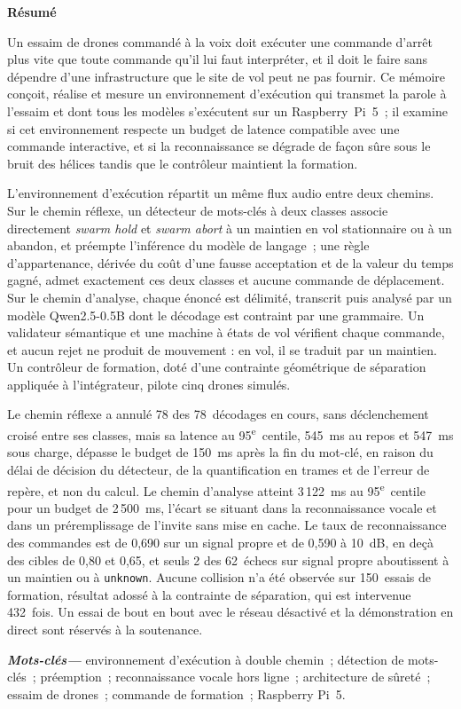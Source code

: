 \thispagestyle{empty}
\vspace*{4cm}
\begin{center}{\Huge\bfseries Résumé}\end{center}
\vskip 1cm
\noindent Un essaim de drones commandé à la voix doit exécuter une commande d'arrêt plus vite que
toute commande qu'il lui faut interpréter, et il doit le faire sans dépendre d'une infrastructure que
le site de vol peut ne pas fournir. Ce mémoire conçoit, réalise et mesure un environnement
d'exécution qui transmet la parole à l'essaim et dont tous les modèles s'exécutent sur un
Raspberry~Pi~5~; il examine si cet environnement respecte un budget de latence compatible avec une
commande interactive, et si la reconnaissance se dégrade de façon sûre sous le bruit des hélices
tandis que le contrôleur maintient la formation.

\vspace{0.3cm}
\noindent L'environnement d'exécution répartit un même flux audio entre deux chemins. Sur le chemin
réflexe, un détecteur de mots-clés à deux classes associe directement \emph{swarm hold} et
\emph{swarm abort} à un maintien en vol stationnaire ou à un abandon, et préempte l'inférence du
modèle de langage~; une règle d'appartenance, dérivée du coût d'une fausse acceptation et de la
valeur du temps gagné, admet exactement ces deux classes et aucune commande de déplacement. Sur le
chemin d'analyse, chaque énoncé est délimité, transcrit puis analysé par un modèle Qwen2.5-0.5B dont
le décodage est contraint par une grammaire. Un validateur sémantique et une machine à états de vol
vérifient chaque commande, et aucun rejet ne produit de mouvement : en vol, il se traduit par un
maintien. Un contrôleur de formation, doté d'une contrainte géométrique de séparation appliquée à
l'intégrateur, pilote cinq drones simulés.

\vspace{0.3cm}
\noindent Le chemin réflexe a annulé 78 des 78~décodages en cours, sans déclenchement croisé entre
ses classes, mais sa latence au 95\textsuperscript{e}~centile, 545~ms au repos et 547~ms sous
charge, dépasse le budget de 150~ms après la fin du mot-clé, en raison du délai de décision du
détecteur, de la quantification en trames et de l'erreur de repère, et non du calcul. Le chemin
d'analyse atteint 3\,122~ms au 95\textsuperscript{e}~centile pour un budget de
2\,500~ms, l'écart se situant dans la reconnaissance vocale et dans un préremplissage de l'invite
sans mise en cache. Le taux de reconnaissance des commandes est de 0,690 sur un signal propre et
de 0,590 à 10~dB, en deçà des cibles de 0,80 et 0,65, et seuls 2 des 62~échecs sur signal propre
aboutissent à un maintien ou à \texttt{unknown}. Aucune collision n'a été observée sur 150~essais
de formation, résultat adossé à la contrainte de séparation, qui est intervenue 432~fois. Un essai
de bout en bout avec le réseau désactivé et la démonstration en direct sont réservés à la
soutenance.

\vspace{1cm}
\providecommand{\motscles}[1]{\textbf{\textit{Mots-clés---}} #1}
\motscles{environnement d'exécution à double chemin~; détection de mots-clés~; préemption~;
reconnaissance vocale hors ligne~; architecture de sûreté~; essaim de drones~; commande de
formation~; Raspberry Pi~5.}
\newpage

